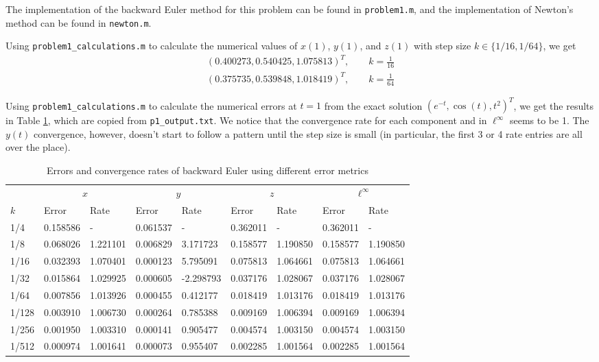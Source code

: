 \documentclass{homework}
\begin{document}
\begin{alphaparts}
		The implementation of the backward Euler method for this problem can be found in \verb*|problem1.m|, and the implementation of Newton's method can be found in \verb*|newton.m|.
		
		\questionpart Using \verb*|problem1_calculations.m| to calculate the numerical values of $x(1)$, $y(1)$, and $z(1)$ with step size $k \in \{1/16, 1/64\}$, we get
		\begin{align*}
			(0.400273, 0.540425, 1.075813)^T, \qquad k = \frac{1}{16} \\
			(0.375735, 0.539848, 1.018419)^T, \qquad k = \frac{1}{64}
		\end{align*}
		
		\questionpart Using \verb*|problem1_calculations.m| to calculate the numerical errors at $t=1$ from the exact solution $(e^{-t}, \cos(t), t^2)^T$, we get the results in Table \ref{table:p1}, which are copied from \verb*|p1_output.txt|. We notice that the convergence rate for each component and in $\ell^\infty$ seems to be 1. The $y(t)$ convergence, however, doesn't start to follow a pattern until the step size is small (in particular, the first 3 or 4 rate entries are all over the place).
 		
		\begin{table}[h]
			\centering
			\renewcommand{\arraystretch}{1.2}
			\begin{tabular}{@{}lllllllll@{}}
				\toprule
				& \multicolumn{2}{c}{$x$} & \multicolumn{2}{c}{$y$} & \multicolumn{2}{c}{$z$} & \multicolumn{2}{c}{$\ell^\infty$} \\
				\cmidrule(lr){2-3}
				\cmidrule(lr){4-5}
				\cmidrule(lr){6-7}
				\cmidrule(lr){8-9}
				$k$ & Error & Rate & Error & Rate & Error & Rate & Error & Rate \\
				\midrule
				1/4 & 0.158586 & - & 0.061537 & - & 0.362011 & - & 0.362011 & - \\
				1/8 & 0.068026 & 1.221101 &	0.006829 & 3.171723 & 0.158577 & 1.190850 & 0.158577 & 1.190850 \\
				1/16 & 0.032393 & 1.070401 & 0.000123 &	5.795091 & 0.075813 & 1.064661 & 0.075813 & 1.064661 \\
				1/32 & 0.015864	& 1.029925 & 0.000605 & -2.298793 & 0.037176 & 1.028067 & 0.037176 & 1.028067 \\
				1/64 & 0.007856	& 1.013926 & 0.000455 & 0.412177 & 0.018419 & 1.013176 & 0.018419 & 1.013176 \\
				1/128 & 0.003910 & 1.006730 & 0.000264 & 0.785388 & 0.009169 & 1.006394 & 0.009169 & 1.006394 \\
				1/256 &	0.001950 & 1.003310 & 0.000141 & 0.905477 & 0.004574 & 1.003150 & 0.004574 & 1.003150 \\
				1/512 &	0.000974 & 1.001641 & 0.000073 & 0.955407 & 0.002285 & 1.001564 & 0.002285 & 1.001564 \\
				\bottomrule
			\end{tabular}
			\caption{Errors and convergence rates of backward Euler using different error metrics}
			\label{table:p1}
		\end{table}
	\end{alphaparts}
	
\end{document}
